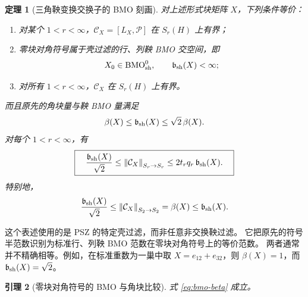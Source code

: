 \documentclass[UTF8,11pt,a4paper,fontset=fandol]{ctexart}
\newtheorem{theorem}{定理}[section]
\newtheorem{lemma}[theorem]{引理}
\theoremstyle{remark}
\newcommand{\PP}{\mathcal P}
\newcommand{\CC}{\mathcal C}
\newcommand{\norm}[1]{\left\lVert #1\right\rVert}
\numberwithin{equation}{section}
\begin{document}
\begin{theorem}[三角鞅变换交换子的 BMO 刻画]\label{thm:sharp}
对上述形式块矩阵 $X$，下列条件等价：
\begin{enumerate}[label=\textup{(\roman*)}]
 \item 对某个 $1<r<\infty$，$\CC_X=[L_X,\PP]$ 在 $S_r(H)$ 上有界；
 \item 零块对角符号属于壳过滤的行、列鞅 BMO 交空间，即
 \[
 X_0\in\mathrm{BMO}_{\rm sh}^{0},\qquad
 \mathfrak b_{\rm sh}(X)<\infty;
 \]
 \item 对所有 $1<r<\infty$，$\CC_X$ 在 $S_r(H)$ 上有界。
\end{enumerate}
而且原先的角块量与鞅 BMO 量满足
\begin{equation}\label{eq:bmo-beta}
 \beta(X)\leq\mathfrak b_{\rm sh}(X)\leq\sqrt2\,\beta(X).
\end{equation}
对每个 $1<r<\infty$，有
\begin{equation}\label{eq:sharpbounds}
 \boxed{\quad
 \frac{\mathfrak b_{\rm sh}(X)}{\sqrt2}
 \leq\norm{\CC_X}_{S_r\to S_r}
 \leq2t_rq_r\,\mathfrak b_{\rm sh}(X).
 \quad}
\end{equation}
特别地，
\begin{equation}\label{eq:exact2}
 \frac{\mathfrak b_{\rm sh}(X)}{\sqrt2}
 \leq\norm{\CC_X}_{S_2\to S_2}
 =\beta(X)\leq\mathfrak b_{\rm sh}(X).
\end{equation}
\end{theorem}

这个表述使用的是 PSZ 的特定壳过滤，而非任意非交换鞅过滤。
它把原先的符号半范数识别为标准行、列鞅 BMO 范数在零块对角符号上的等价范数。
两者通常并不精确相等。例如，在标准重数为一巢中取
$X=e_{12}+e_{32}$，则 $\beta(X)=1$，而 $\mathfrak b_{\rm sh}(X)=\sqrt2$。

\begin{lemma}[零块对角符号的 BMO 与角块比较]\label{lem:bmo-beta}
式 \eqref{eq:bmo-beta} 成立。
\end{lemma}
\end{document}
